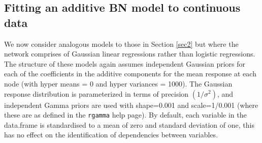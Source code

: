 \documentclass[nojss]{jss}
\begin{document}
\subsection{Fitting an additive BN model to continuous data} \label{sec3} 
We now consider analogous models to those in Section \ref{sec2} but where the network comprises of Gaussian linear regressions rather than logistic regressions. The structure of these models again assumes independent Gaussian priors for each of the coefficients in the additive components for the mean response at each node (with hyper means = 0 and hyper variances = 1000). The Gaussian response distribution is parameterized in terms of precision $(1/\sigma^2)$, and independent Gamma priors are used with shape=0.001 and scale=1/0.001 (where these are as defined in the {\tt rgamma} help page). By default, each variable in the data.frame is standardised to a mean of zero and standard deviation of one, this has no effect on the identification of dependencies between variables. 
\end{document}
